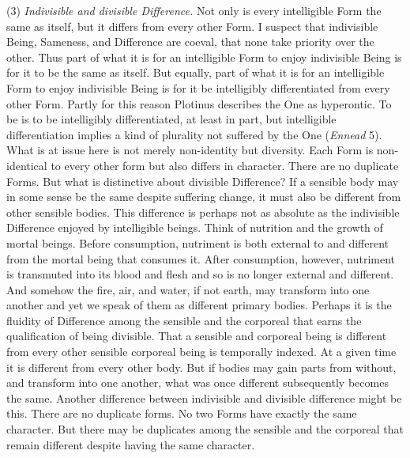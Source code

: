 (3) \emph{Indivisible and divisible Difference.} Not only is every intelligible Form the same as itself, but it differs from every other Form. I suspect that indivisible Being, Sameness, and Difference are coeval, that none take priority over the other. Thus part of what it is for an intelligible Form to enjoy indivisible Being is for it to be the same as itself. But equally, part of what it is for an intelligible Form to enjoy indivisible Being is for it be intelligibly differentiated from every other Form. Partly for this reason Plotinus describes the One as hyperontic. To be is to be intelligibly differentiated, at least in part, but intelligible differentiation implies a kind of plurality not suffered by the One (\emph{Ennead} 5). What is at issue here is not merely non-identity but diversity. Each Form is non-identical to every other form but also differs in character. There are no duplicate Forms. But what is distinctive about divisible Difference? If a sensible body may in some sense be the same despite suffering change, it must also be different from other sensible bodies. This difference is perhaps not as absolute as the indivisible Difference enjoyed by intelligible beings. Think of nutrition and the growth of mortal beings. Before consumption, nutriment is both external to and different from the mortal being that consumes it. After consumption, however, nutriment is transmuted into its blood and flesh and so is no longer external and different. And somehow the fire, air, and water, if not earth, may transform into one another and yet we speak of them as different primary bodies. Perhaps it is the fluidity of Difference among the sensible and the corporeal that earns the qualification of being divisible. That a sensible and corporeal being is different from every other sensible corporeal being is temporally indexed. At a given time it is different from every other body. But if bodies may gain parts from without, and transform into one another, what was once different subsequently becomes the same. Another difference between indivisible and divisible difference might be this. There are no duplicate forms. No two Forms have exactly the same character. But there may be duplicates among the sensible and the corporeal that remain different despite having the same character.

